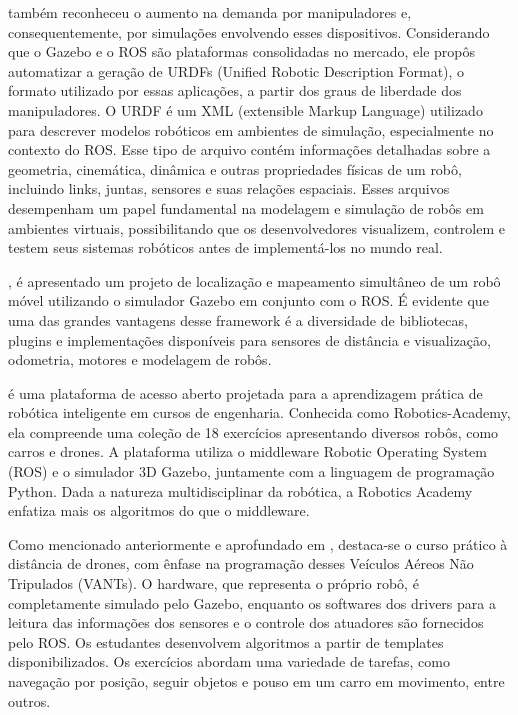  também reconheceu o aumento na demanda por manipuladores e, consequentemente, por simulações envolvendo esses dispositivos. Considerando que o Gazebo e o ROS são plataformas consolidadas no mercado, ele propôs automatizar a geração de URDFs (Unified Robotic Description Format), o formato utilizado por essas aplicações, a partir dos graus de liberdade dos manipuladores. O URDF é um XML (extensible Markup Language) utilizado para descrever modelos robóticos em ambientes de simulação, especialmente no contexto do ROS. Esse tipo de arquivo contém informações detalhadas sobre a geometria, cinemática, dinâmica e outras propriedades físicas de um robô, incluindo links, juntas, sensores e suas relações espaciais. Esses arquivos desempenham um papel fundamental na modelagem e simulação de robôs em ambientes virtuais, possibilitando que os desenvolvedores visualizem, controlem e testem seus sistemas robóticos antes de implementá-los no mundo real.

, é apresentado um projeto de localização e mapeamento simultâneo de um robô móvel utilizando o simulador Gazebo em conjunto com o ROS. É evidente que uma das grandes vantagens desse framework é a diversidade de bibliotecas, plugins e implementações disponíveis para sensores de distância e visualização, odometria, motores e modelagem de robôs.

 é uma plataforma de acesso aberto projetada para a aprendizagem prática de robótica inteligente em cursos de engenharia. Conhecida como Robotics-Academy, ela compreende uma coleção de 18 exercícios apresentando diversos robôs, como carros e drones. A plataforma utiliza o middleware Robotic Operating System (ROS) e o simulador 3D Gazebo, juntamente com a linguagem de programação Python. Dada a natureza multidisciplinar da robótica, a Robotics Academy enfatiza mais os algoritmos do que o middleware.

Como mencionado anteriormente e aprofundado em , destaca-se o curso prático à distância de drones, com ênfase na programação desses Veículos Aéreos Não Tripulados (VANTs). O hardware, que representa o próprio robô, é completamente simulado pelo Gazebo, enquanto os softwares dos drivers para a leitura das informações dos sensores e o controle dos atuadores são fornecidos pelo ROS. Os estudantes desenvolvem algoritmos a partir de templates disponibilizados. Os exercícios abordam uma variedade de tarefas, como navegação por posição, seguir objetos e pouso em um carro em movimento, entre outros.

